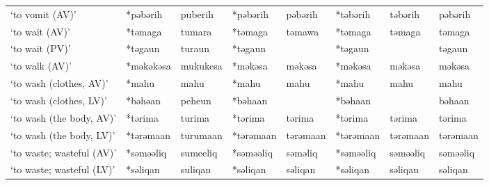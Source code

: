 \begin{landscape}
\begin{longtable}[c]{@{}p{3cm}<{\raggedright}p{2.75cm}<{\raggedright}p{2.75cm}<{\raggedright}p{2.75cm}<{\raggedright}p{2.75cm}<{\raggedright}p{2.75cm}<{\raggedright}p{2.75cm}<{\raggedright}p{2.75cm}<{\raggedright}@{}}
`to vomit (AV)'                                      & *pəbərih           & puberih                        & *pəbərih           & pəbərih                    & *təbərih         & təbərih                  & pəbərih                           \\
`to wait (AV)'                                       & *təmaga            & tumara                         & *təmaga            & təmawa                     & *təmaga          & təmaga                   & təmaga                            \\
`to wait (PV)'                                       & *təgaun            & turaun                         & *təgaun            &                            & *təgaun          &                          & təgaun                            \\
`to walk (AV)'                                       & *məkəkəsa          & mukukesa                       & *məkəsa            & məkəsa                     & *məkəsa          & məkəsa                   & məkəsa                            \\
`to wash (clothes, AV)'                              & *mahu              & mahu                           & *mahu              & mahu                       & *mahu            & mahu                     & mahu                              \\
`to wash (clothes, LV)'                              & *bəhəan            & peheun                         & *bəhaan            &                            & *bəhaan          &                          & bəhaan                            \\
`to wash (the body, AV)'                             & *tərima            & turima                         & *tərima            & tərima                     & *tərima          & tərima                   & tərima                            \\
`to wash (the body, LV)'                             & *tərəmaan          & turumaan                       & *tərəmaan          & tərəmaan                   & *tərəmaan        & tərəmaan                 & tərəmaan                          \\
`to waste; wasteful (AV)'                            & *səməəliq          & sumeeliq                       & *səməəliq          & səməliq                    & *səməəliq        & səməəliq                 & səməəliq                          \\
`to waste; wasteful (LV)'                            & *səliqan           & suliqan                        & *səliqan           & səliqan                    & *səliqan         & səliqan                  & səliqan                           \\

\end{longtable}
\end{landscape}

